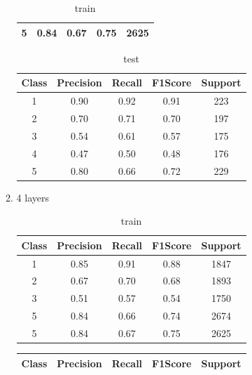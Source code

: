 \begin{enumerate}[label=(\alph*)]
\begin{enumerate}[label=\roman*.]
\begin{table}[!htb]
\begin{tabular}{ccccc}
            5     & 0.84      & 0.67   & 0.75    & 2625    \\ \hline
            \end{tabular}
            \caption{train}
            \label{part d train depth 3}
        \end{table}
        \begin{table}[!htb]
            \centering
            \begin{tabular}{ccccc}
            \hline
            Class & Precision & Recall & F1Score & Support \\ \hline
            1     & 0.90      & 0.92   & 0.91    & 223     \\
            2     & 0.70      & 0.71   & 0.70    & 197     \\
            3     & 0.54      & 0.61   & 0.57    & 175     \\
            4     & 0.47      & 0.50   & 0.48    & 176     \\
            5     & 0.80      & 0.66   & 0.72    & 229     \\ \hline
            \end{tabular}
            \caption{test}
            \label{part d test depth 3}
        \end{table}
        \item 4 layers
        \begin{table}[!htb]
            \centering
            \begin{tabular}{ccccc}
            \hline
            Class & Precision & Recall & F1Score & Support \\ \hline
            1     & 0.85      & 0.91   & 0.88    & 1847    \\
            2     & 0.67      & 0.70   & 0.68    & 1893    \\
            3     & 0.51      & 0.57   & 0.54    & 1750    \\
            5     & 0.84      & 0.66   & 0.74    & 2674    \\
            5     & 0.84      & 0.67   & 0.75    & 2625    \\ \hline
            \end{tabular}
            \caption{train}
            \label{part d train depth 4}
            \end{table}
        \begin{table}[!htb]
            \centering
            \begin{tabular}{ccccc}
            \hline
            Class & Precision & Recall & F1Score & Support \\ \hline

\end{tabular}
\end{table}
\end{enumerate}
\end{enumerate}
